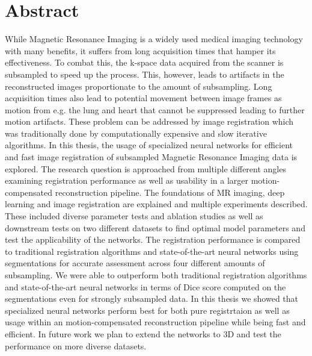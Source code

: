 \chapter*{Abstract}
While Magnetic Resonance Imaging is a widely used medical imaging technology with many benefits, it suffers from long acquisition times that hamper its effectiveness. 
To combat this, the k-space data acquired from the scanner is subsampled to speed up the process. 
This, however, leads to artifacts in the reconstructed images proportionate to the amount of subsampling.
Long acquisition times also lead to potential movement between image frames as motion from e.g. the lung and heart that cannot be suppressed leading to further motion artifacts. These problem can be addressed by image registration which was traditionally done by computationally expensive and slow iterative algorithms. In this thesis, the usage of specialized neural networks for efficient and fast image registration of subsampled Magnetic Resonance Imaging data is explored. The research question is approached from multiple different angles examining registration performance as well as usability in a larger motion-compensated reconstruction pipeline. The foundations of MR imaging, deep learning and image registration are explained and multiple experiments described. These included diverse parameter tests and ablation studies as well as downstream tests on two different datasets to find optimal model parameters and test the applicability of the networks. The registration performance is compared to traditional registration algorithms and state-of-the-art neural networks using segmentations for accurate assessment across four different amounts of subsampling. We were able to outperform both traditional registration algorithms and state-of-the-art neural networks in terms of Dice score computed on the segmentations even for strongly subsampled data. In this thesis we showed that specialized neural networks perform best for both pure registrtaion as well as usage within an motion-compensated reconstruction pipeline while being fast and efficient. In future work we plan to extend the networks to 3D and test the performance on more diverse datasets.

